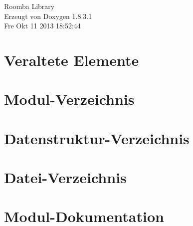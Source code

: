 \documentclass{book}
\begin{document}
\hypersetup{pageanchor=false,citecolor=blue}
\begin{titlepage}
\vspace*{7cm}
\begin{center}
{\Large Roomba Library }\\
\vspace*{1cm}
{\large Erzeugt von Doxygen 1.8.3.1}\\
\vspace*{0.5cm}
{\small Fre Okt 11 2013 18:52:44}\\
\end{center}
\end{titlepage}
\clearemptydoublepage
{}
\tableofcontents
\clearemptydoublepage
{}
\hypersetup{pageanchor=true,citecolor=blue}
\chapter{Veraltete Elemente}
\label{deprecated}
\hypertarget{deprecated}{}

\chapter{Modul-\/\-Verzeichnis}

\chapter{Datenstruktur-\/\-Verzeichnis}

\chapter{Datei-\/\-Verzeichnis}

\chapter{Modul-\/\-Dokumentation}



























\end{document}

